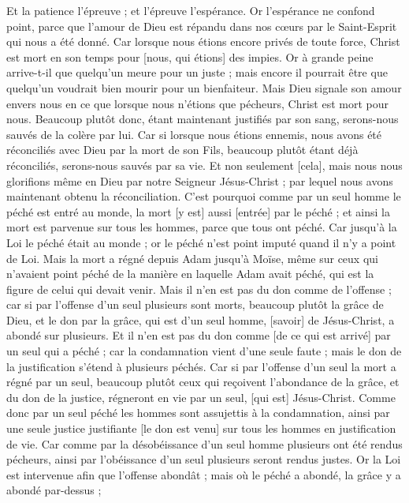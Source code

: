 \begin{multicols}{2}
Et la patience l'épreuve ; et l'épreuve l'espérance.
Or l'espérance ne confond point, parce que l'amour de Dieu est répandu dans nos cœurs par le Saint-Esprit qui nous a été donné.
Car lorsque nous étions encore privés de toute force, Christ est mort en son temps pour [nous, qui étions] des impies.
Or à grande peine arrive-t-il que quelqu'un meure pour un juste ; mais encore il pourrait être que quelqu'un voudrait bien mourir pour un bienfaiteur.
Mais Dieu signale son amour envers nous en ce que lorsque nous n'étions que pécheurs, Christ est mort pour nous.
Beaucoup plutôt donc, étant maintenant justifiés par son sang, serons-nous sauvés de la colère par lui.
Car si lorsque nous étions ennemis, nous avons été réconciliés avec Dieu par la mort de son Fils, beaucoup plutôt étant déjà réconciliés, serons-nous sauvés par sa vie.
Et non seulement [cela], mais nous nous glorifions même en Dieu par notre Seigneur Jésus-Christ ; par lequel nous avons maintenant obtenu la réconciliation.
C'est pourquoi comme par un seul homme le péché est entré au monde, la mort [y est] aussi [entrée] par le péché ; et ainsi la mort est parvenue sur tous les hommes, parce que tous ont péché.
Car jusqu'à la Loi le péché était au monde ; or le péché n'est point imputé quand il n'y a point de Loi.
Mais la mort a régné depuis Adam jusqu'à Moïse, même sur ceux qui n'avaient point péché de la manière en laquelle Adam avait péché, qui est la figure de celui qui devait venir.
Mais il n'en est pas du don comme de l'offense ; car si par l'offense d'un seul plusieurs sont morts, beaucoup plutôt la grâce de Dieu, et le don par la grâce, qui est d'un seul homme, [savoir] de Jésus-Christ, a abondé sur plusieurs.
Et il n'en est pas du don comme [de ce qui est arrivé] par un seul qui a péché ; car la condamnation vient d'une seule faute ; mais le don de la justification s'étend à plusieurs péchés.
Car si par l'offense d'un seul la mort a régné par un seul, beaucoup plutôt ceux qui reçoivent l'abondance de la grâce, et du don de la justice, régneront en vie par un seul, [qui est] Jésus-Christ.
Comme donc par un seul péché les hommes sont assujettis à la condamnation, ainsi par une seule justice justifiante [le don est venu] sur tous les hommes en justification de vie.
Car comme par la désobéissance d'un seul homme plusieurs ont été rendus pécheurs, ainsi par l'obéissance d'un seul plusieurs seront rendus justes.
Or la Loi est intervenue afin que l'offense abondât ; mais où le péché a abondé, la grâce y a abondé par-dessus ;

\end{multicols}
